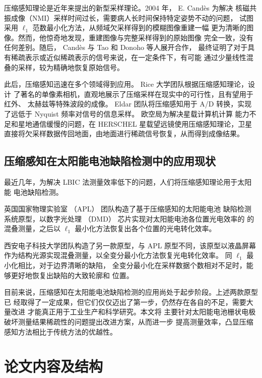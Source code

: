 压缩感知理论是近年来提出的新型采样理论。2004 年， E. Cand\`es 为解决
核磁共振成像（NMI）采样时间过长，需要病人长时间保持特定姿势不动的问题，
试图采用 $\ell_1$ 范数最小化方法，从频域欠采样得到的模糊图像重建一幅
更为清晰的图像。然而，他惊奇地发现，重建图像与完整采样得到的原始图像
完全一致，没有任何差别。随后， Cand\`es 与 Tao 和 Donoho 等人展开合作，
最终证明了对于具有稀疏表示或近似稀疏表示的信号来说，在一定条件下，有可能
通过少量线性混叠的采样，较为精确地恢复原始信号。\cite{CS2006}

此后，压缩感知迅速在多个领域得到应用。 Rice 大学团队根据压缩感知理论，设计
了著名的单像素相机，直观地展示了压缩采样在现实中的可行性，且有望用于红外、
太赫兹等特殊波段的成像。\cite{SinglePixel} Eldar 团队将压缩感知用于 A/D
转换，实现了远低于 Nyquist 频率对信号的信息采样。\cite{CSAD} 
欧空局为解决星载计算机计算
能力不足和星地通信缓慢的问题，在 HERSCHEL 星载望远镜使用压缩感知理论，卫星
直接将欠采样数据传回地面，由地面进行稀疏信号恢复，从而得到成像结果。
\cite{HERSCHEL}

\subsection{压缩感知在太阳能电池缺陷检测中的应用现状}

最近几年，为解决 LBIC 法测量效率低下的问题，人们将压缩感知理论用于太阳能
电池缺陷检测。

英国国家物理实验室 （APL） 团队构造了基于压缩感知的太阳能电池
缺陷检测系统原型，以数字光处理 （DMD） 芯片实现对太阳能电池各位置光电效率的
的混叠测量，之后以 $\ell_1$ 最小化方法恢复出各个位置的光电转化效率。
\cite{CLBIC16} \cite{CLBIC17}

西安电子科技大学团队构造了另一款原型，与 APL 原型不同，该原型以液晶屏幕
作为结构光源实现混叠测量，以全变分最小化方法恢复光电转化效率。
\cite{XDUCLBIC} 同 $\ell_1$ 最小化相比，对于边界清晰的缺陷，
全变分最小化在采样数据个数相对不足时，能够更好地恢复出缺陷的大致轮廓和
位置。

目前来说，压缩感知在太阳能电池缺陷检测的应用尚处于起步阶段。上述两款原型已
经取得了一定成果，但它们仅仅迈出了第一步，仍然存在各自的不足，需要大量改进
才能真正用于工业生产和科学研究。本文将
主要针对太阳能电池栅状电极破坏测量结果稀疏性的问题提出改进方案，从而进一步
提高测量效率，凸显压缩感知方法相比于传统方法的优越性。

\section{论文内容及结构}

